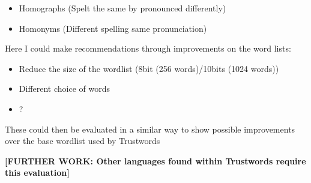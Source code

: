 \begin{itemize}
    \item Homographs (Spelt the same by pronounced differently)
    \item Homonyms   (Different spelling same pronunciation)
\end{itemize}


Here I could make recommendations through improvements on the word lists:

\begin{itemize}
    \item Reduce the size of the wordlist (8bit (256 words)/10bits (1024 words))
    \item Different choice of words
    \item ?
\end{itemize}

These could then be evaluated in a similar way to show possible improvements over the base wordlist used by Trustwords

\textbf{[FURTHER WORK: Other languages found within Trustwords require this evaluation]}